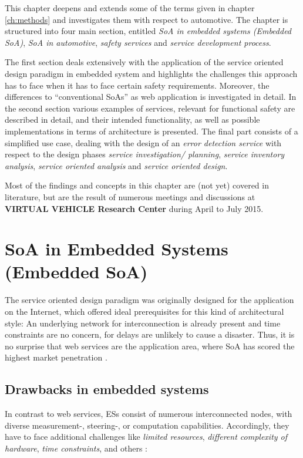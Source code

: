 \label{ch:results}
This chapter deepens and extends some of the terms given in chapter \ref{ch:methods} and investigates them with respect to automotive. The chapter is structured into four main section, entitled \emph{SoA in embedded systems (Embedded SoA)}, \emph{SoA in automotive}, \emph{safety services} and \emph{service development process}. 

The first section deals extensively with the application of the service oriented design paradigm in embedded system and highlights the challenges this approach has to face when it has to face certain safety requirements. Moreover, the differences to ``conventional SoAs'' as web application is investigated in detail. In the second section various examples of services, relevant for functional safety are described in detail, and their intended functionality, as well as possible implementations in terms of architecture is presented. The final part consists of a simplified use case, dealing with the design of an \emph{error detection service} with respect to the design phases \emph{service investigation/ planning}, \emph{service inventory analysis}, \emph{service oriented analysis} and \emph{service oriented design}.

Most of the findings and concepts in this chapter are (not yet) covered in literature, but are the result of numerous meetings and discussions at \textbf{VIRTUAL VEHICLE Research Center} during April to July 2015.







\section{SoA in Embedded Systems (Embedded SoA)}
\label{sec:soa-in-embedded-systems}

The service oriented design paradigm was originally designed for the application on the Internet, which offered ideal prerequisites for this kind of architectural style: An underlying network for interconnection is already present and time constraints are no concern, for delays are unlikely to cause a disaster. Thus, it is no surprise that web services are the application area, where SoA has scored the highest market penetration \cite{rodrigues2011} \cite{buckl}.


\subsection{Drawbacks in embedded systems}
In contrast to web services, ESs consist of numerous interconnected nodes, with diverse measurement-, steering-, or computation capabilities. Accordingly, they have to face additional challenges like \emph{limited resources}, \emph{different complexity of hardware}, \emph{time constraints}, and others \cite{scholz} \cite{sommer}: 

